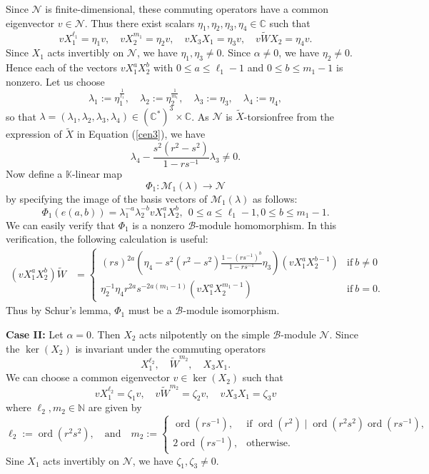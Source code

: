 \documentclass[12 pt,reqno]{amsart}
\numberwithin{equation}{section}
\newcommand{\C}{\mathbb{C}}
\newcommand{\B}{\mathcal{B}}
\DeclareMathOperator{\ord}{ord}
\theoremstyle{definition}
\theoremstyle{definition}
\theoremstyle{remark}
\theoremstyle{remark}
\begin{document}
 \noindent Since $\mathcal{N}$ is finite-dimensional, these commuting operators have a common eigenvector $v\in\mathcal{N}$. Thus there exist scalars $\eta_1,\eta_2,\eta_3,\eta_4\in\C$ such that
\begin{equation}\label{commeigen}
    vX_{1}^{\ell_1}=\eta_1v,\quad vX_{2}^{m_1}=\eta_2v, \quad vX_{3}X_{1}=\eta_3v, \quad v\tilde{W}X_2=\eta_4v.
\end{equation}
Since $X_1$ acts invertibly on $\mathcal{N}$, we have $\eta_1, \eta_3 \neq 0$. Since $\alpha \neq 0$, we have $\eta_2 \neq 0$. Hence each of the vectors $vX_1^{a}X_2^{b}$ with $0 \leq a \leq \ell_1-1$ and $0 \leq b \leq m_1-1$ is nonzero. Let us choose
\[\lambda_1:=\eta_1^{\frac{1}{\ell_1}},\quad \lambda_2:=\eta_2^{\frac{1}{m_1}}, \quad \lambda_3:=\eta_3,\quad \lambda_4:=\eta_4,\] so that
$\lambda=(\lambda_1,\lambda_2,\lambda_3,\lambda_4)\in {(\mathbb{C}^*)}^3 \times \mathbb{C}$. As $\mathcal{N}$ is $\tilde{X}$-torsionfree from the expression of $\tilde{X}$ in Equation (\ref{cen3}), we have 
\[\lambda_4-\displaystyle\frac{s^2(r^2-s^2)}{1-rs^{-1}}\lambda_3\neq 0.\]Now define a $\mathbb{K}$-linear map \[\Phi_1:\mathcal{M}_1(\lambda)\rightarrow \mathcal{N}\] by specifying the image of the basis vectors of $\mathcal{M}_1(\lambda)$ as follows:
\[\Phi_1\left(e(a,b)\right)=\lambda_1^{-a}\lambda_2^{-b}vX_{1}^aX_{2}^b,\ \ 0\leq a\leq \ell_1-1, 0 \leq b \leq m_1-1.\] We can easily verify that $\Phi_1$ is a nonzero $\B$-module homomorphism. In this verification, the following calculation is useful:
\begin{align*}
    (vX_{1}^aX_{2}^b)\tilde{W}&=\begin{cases}
    (rs)^{2a}\left(\eta_4-s^2(r^2-s^2)\displaystyle\frac{1-(rs^{-1})^b}{1-rs^{-1}}\eta_3\right)\left(vX_1^{a}X_2^{b-1}\right)&\text{if}\ b\neq 0\\
    \eta_2^{-1}\eta_4r^{2a}s^{-2a(m_1-1)}(vX_{1}^{a}X_{2}^{m_1-1})&\text{if}\ b= 0.
    \end{cases}    
\end{align*} Thus by Schur's lemma, $\Phi_1$ must be a $\B$-module isomorphism.

\noindent\textbf{Case II:} Let $\alpha=0$. Then $X_2$ acts nilpotently on the simple $\B$-module $\mathcal{N}$. Since the $\ker(X_2)$ is invariant under the commuting operators 
\[X_1^{\ell_2},\quad \tilde{W}^{m_2},\quad  X_3X_1.\] We can choose a common eigenvector $v \in \ker(X_2)$ such that 
\[vX_1^{\ell_2}=\zeta_1v,\quad v\tilde{W}^{m_2}=\zeta_2v, \quad vX_3X_1=\zeta_3v\] where $ \ell_2, m_2 \in \mathbb{N} $ are given by  
$$
  \ell_2 := \ord(r^{2}s^2), \quad \text{and}\quad   m_2 := 
    \begin{cases}
        \ord(rs^{-1}), & \text{if } \ord(r^2) \mid \ord(r^{2}s^2) \ord(rs^{-1}), \\[5pt]
        2\ord(rs^{-1}), & \text{otherwise}.
    \end{cases}
$$ Sine $X_1$ acts invertibly on $\mathcal{N}$, we have $\zeta_1, \zeta_3 \neq 0$.
\end{document}
